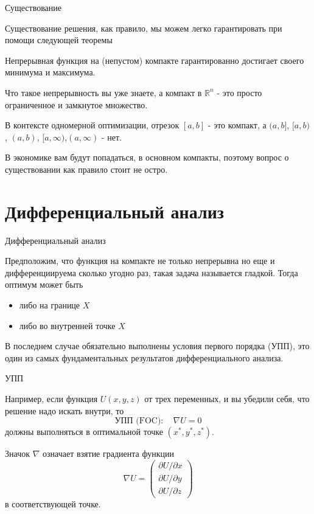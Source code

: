 \documentclass{beamer}
\begin{document}
\begin{frame}{Существование}

Существование решения, как правило, мы можем легко гарантировать при помощи следующей теоремы

\begin{theorem}[Вейерштрасса]

Непрерывная функция на (непустом) компакте гарантированно достигает своего минимума и максимума.
\end{theorem}

Что такое \alert{непрерывность} вы уже знаете, а \alert{компакт} в $\mathbb{R}^n$ - это просто ограниченное и замкнутое множество. 

В контексте одномерной оптимизации, отрезок $[a,b]$ - это компакт, а $(a,b]$, $[a,b)$, $(a,b)$, $[a,\infty)$,$(a,\infty)$ - нет. 

В экономике вам будут попадаться, в основном компакты, поэтому вопрос о существовании как правило стоит не остро.

\end{frame}

\section{Дифференциальный анализ}

\begin{frame}{Дифференциальный анализ}

Предположим, что функция на компакте не только непрерывна но еще и дифференциируема сколько угодно раз, такая задача называется \alert{гладкой}. Тогда оптимум может быть

\begin{itemize}
  \item либо на границе $X$
  \item либо во внутренней точке $X$
\end{itemize}

В последнем случае обязательно выполнены \alert{условия первого порядка} (УПП), это один из самых фундаментальных результатов дифференциального анализа.

\end{frame}

\begin{frame}{УПП}

Например, если функция $U(x, y, z)$ от трех переменных, и вы убедили себя, что решение надо искать внутри, то
$$\text{УПП (FOC)}: \quad  \nabla U = 0$$ 
должны выполняться в оптимальной точке $(x^{\ast}, y^{\ast}, z^{\ast})$. 

Значок $\nabla$ означает взятие градиента функции $$ \nabla U = \begin{pmatrix} \partial U/\partial x \\ \partial U/\partial y \\ \partial U/\partial z \end{pmatrix}$$
в соответствующей точке.

\end{frame}
\end{document}
